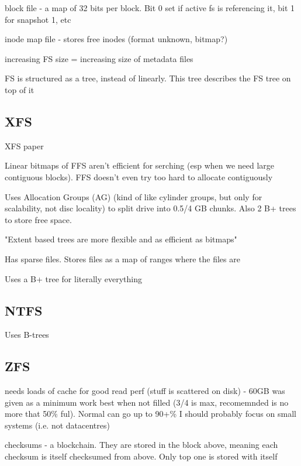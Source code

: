 \documentclass[a4paper]{report}
\begin{document}
        block file - a map of 32 bits per block. Bit 0 set if active fs is referencing
        it, bit 1 for snapshot 1, etc

        inode map file - stores free inodes (format unknown, bitmap?)

        increasing FS size = increasing size of metadata files

        FS is structured as a tree, instead of linearly. This tree describes
        the FS tree on top of it

    \subsection{XFS}
        XFS paper

        Linear bitmaps of FFS aren't efficient for serching (esp when we need
        large contiguous blocks). FFS doesn't even try too hard to allocate
        contiguously

        Uses Allocation Groups (AG) (kind of like cylinder groups, but only for
        scalability, not disc locality) to split drive into 0.5/4 GB chunks.
        Also 2 B+ trees to store free space.

        "Extent based trees are more flexible and as efficient as bitmaps"

        Has sparse files. Stores files as a map of ranges where the files are

        Uses a B+ tree for literally everything

    \subsection{NTFS}

        Uses B-trees


    \subsection{ZFS}
        needs loads of cache for good read perf (stuff is scattered on disk) -
        60GB was given as a minimum work best when not filled (3/4 is max,
        recomemnded is no more that 50\% ful). Normal can go up to 90+\% I
        should probably focus on small systems (i.e. not datacentres)

        checksums - a blockchain. They are stored in the block above, meaning
        each checksum is itself checksumed from above. Only top one is stored
        with itself
\end{document}
